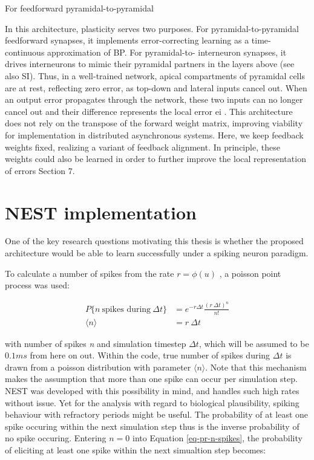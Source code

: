 For feedforward pyramidal-to-pyramidal

In this architecture, plasticity serves two purposes. For pyramidal-to-pyramidal feedforward synapses, it implements
error-correcting learning as a time-continuous approximation of BP. For pyramidal-to- interneuron synapses, it drives
interneurons to mimic their pyramidal partners in the layers above (see also SI). Thus, in a well-trained network,
apical compartments of pyramidal cells are at rest, reflecting zero error, as top-down and lateral inputs cancel out.
When an output error propagates through the network, these two inputs can no longer cancel out and their difference
represents the local error ei . This architecture does not rely on the transpose of the forward weight matrix, improving
viability for implementation in distributed asynchronous systems. Here, we keep feedback weights fixed, realizing a
variant of feedback alignment. In principle, these weights could also be learned in order to further improve the local
representation of errors Section 7.



\section{NEST implementation}

One of the key research questions motivating this thesis is whether the proposed architecture would be able to learn
successfully under a spiking neuron paradigm.


To calculate a number of spikes from the rate $r = \phi(u)$ , a poisson point process was used:

\begin{align}
  P\{\textit{n} \ \text{spikes during} \ \Delta t\} & = e^{-r \Delta t} \frac{(r \ \Delta t) ^ n}{n!}\label{eq-pr-n-spikes} \\
  \langle \textit{n} \rangle                        & = r \ \Delta t
\end{align}

with number of spikes \textit{n} and simulation timestep $\Delta t$, which will be assumed to be $0.1 ms$ from here on
out. Within the code, true number of spikes during $\Delta t$ is drawn from a poisson distribution with parameter
$\langle n \rangle$. Note that this mechanism makes the assumption that more than one spike can occur per simulation
step. NEST was developed with this possibility in mind, and handles such high rates without issue. Yet for the analysis
with regard to biological plausibility, spiking behaviour with refractory periods might be useful. The probability of at
least one spike occuring within the next simulation step thus is the inverse probability of no spike occuring. Entering
$n=0$ into Equation \ref{eq-pr-n-spikes}, the probability of eliciting at least one spike within the next simualtion
step becomes:

